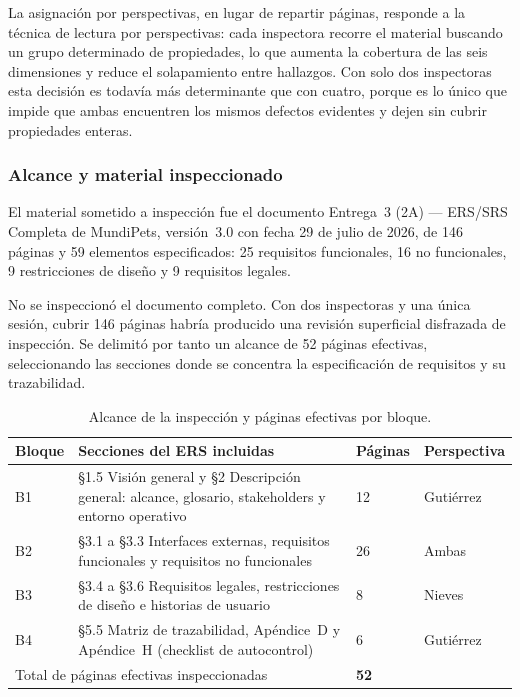 \documentclass[journal,onecolumn]{IEEEtran}
\begin{document}
	La asignación por perspectivas, en lugar de repartir páginas, responde a la
	técnica de lectura por perspectivas: cada inspectora recorre el material
	buscando un grupo determinado de propiedades, lo que aumenta la cobertura de
	las seis dimensiones y reduce el solapamiento entre hallazgos. Con solo dos
	inspectoras esta decisión es todavía más determinante que con cuatro, porque
	es lo único que impide que ambas encuentren los mismos defectos evidentes y
	dejen sin cubrir propiedades enteras.
	
	\subsubsection{Alcance y material inspeccionado}
	
	El material sometido a inspección fue el documento Entrega~3 (2A) —
	ERS/SRS Completa de MundiPets, versión~3.0 con fecha 29 de julio de 2026, de
	146 páginas y 59 elementos especificados: 25 requisitos funcionales, 16 no
	funcionales, 9 restricciones de diseño y 9 requisitos legales.
	
	No se inspeccionó el documento completo. Con dos inspectoras y una única
	sesión, cubrir 146 páginas habría producido una revisión superficial
	disfrazada de inspección. Se delimitó por tanto un alcance de 52 páginas
	efectivas, seleccionando las secciones donde se concentra la especificación
	de requisitos y su trazabilidad.
	
	\begin{table}[h!]
		\centering
		\caption{Alcance de la inspección y páginas efectivas por bloque.}
		\label{tab:alcance-inspeccion}
		\begin{tabular}{p{1cm} p{7cm} p{1.8cm} p{2cm}}
			\toprule
			\textbf{Bloque} & \textbf{Secciones del ERS incluidas} & \textbf{Páginas} & \textbf{Perspectiva} \\
			\midrule
			B1 & \S1.5 Visión general y \S2 Descripción general: alcance,
			glosario, stakeholders y entorno operativo & 12 & Gutiérrez \\
			B2 & \S3.1 a \S3.3 Interfaces externas, requisitos funcionales y
			requisitos no funcionales & 26 & Ambas \\
			B3 & \S3.4 a \S3.6 Requisitos legales, restricciones de diseño e
			historias de usuario & 8 & Nieves \\
			B4 & \S5.5 Matriz de trazabilidad, Apéndice~D y Apéndice~H
			(checklist de autocontrol) & 6 & Gutiérrez \\
			\midrule
			\multicolumn{2}{l}{Total de páginas efectivas inspeccionadas} & \textbf{52} & \\
			\bottomrule
		\end{tabular}
	\end{table}
	
\end{document}
